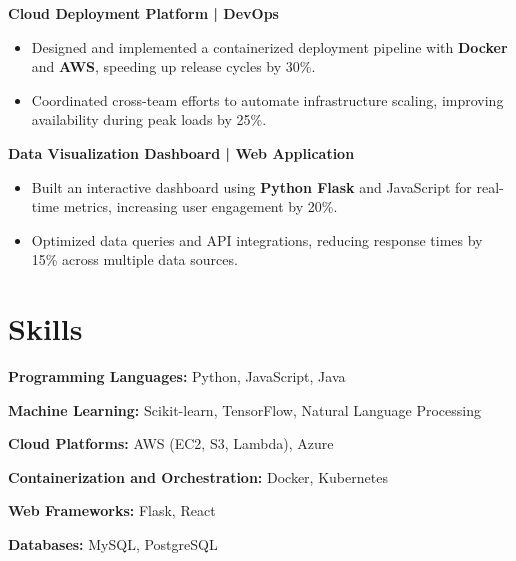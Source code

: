 \textbf{Cloud Deployment Platform | DevOps}
\begin{itemize}
\item Designed and implemented a containerized deployment pipeline with \textbf{Docker} and \textbf{AWS}, speeding up release cycles by 30\%.
\item Coordinated cross-team efforts to automate infrastructure scaling, improving availability during peak loads by 25\%.
\end{itemize}

\textbf{Data Visualization Dashboard | Web Application}
\begin{itemize}
\item Built an interactive dashboard using \textbf{Python Flask} and JavaScript for real-time metrics, increasing user engagement by 20\%.
\item Optimized data queries and API integrations, reducing response times by 15\% across multiple data sources.
\end{itemize}

\section{Skills}
\textbf{Programming Languages:} Python, JavaScript, Java

\textbf{Machine Learning:} Scikit-learn, TensorFlow, Natural Language Processing

\textbf{Cloud Platforms:} AWS (EC2, S3, Lambda), Azure

\textbf{Containerization and Orchestration:} Docker, Kubernetes

\textbf{Web Frameworks:} Flask, React

\textbf{Databases:} MySQL, PostgreSQL
